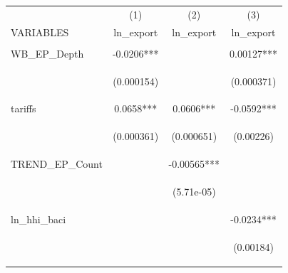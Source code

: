 \documentclass[]{article}
\begin{document}
\begin{center}
\begin{tabular}{lccc} \hline
 & (1) & (2) & (3) \\
VARIABLES & ln\_export & ln\_export & ln\_export \\ \hline
\vspace{4pt} & \begin{footnotesize}\end{footnotesize} & \begin{footnotesize}\end{footnotesize} & \begin{footnotesize}\end{footnotesize} \\
WB\_EP\_Depth & -0.0206*** &  & 0.00127*** \\
\vspace{4pt} & \begin{footnotesize}(0.000154)\end{footnotesize} & \begin{footnotesize}\end{footnotesize} & \begin{footnotesize}(0.000371)\end{footnotesize} \\
tariffs & 0.0658*** & 0.0606*** & -0.0592*** \\
\vspace{4pt} & \begin{footnotesize}(0.000361)\end{footnotesize} & \begin{footnotesize}(0.000651)\end{footnotesize} & \begin{footnotesize}(0.00226)\end{footnotesize} \\
TREND\_EP\_Count &  & -0.00565*** &  \\
\vspace{4pt} & \begin{footnotesize}\end{footnotesize} & \begin{footnotesize}(5.71e-05)\end{footnotesize} & \begin{footnotesize}\end{footnotesize} \\
ln\_hhi\_baci &  &  & -0.0234*** \\
\vspace{4pt} & \begin{footnotesize}\end{footnotesize} & \begin{footnotesize}\end{footnotesize} & \begin{footnotesize}(0.00184)\end{footnotesize} \\

\end{tabular}
\end{center}
\end{document}
